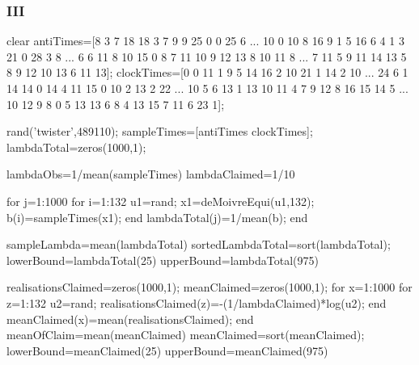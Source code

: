 \subsubsection*{III}
\begin{VrbM}
clear
antiTimes=[8 3 7 18 18 3 7 9 9 25 0 0 25 6 ...
  10 0 10 8 16 9 1 5 16 6 4 1 3 21 0 28 3 8 ...
  6 6 11 8 10 15 0 8 7 11 10 9 12 13 8 10 11 8 ...
    7 11 5 9 11 14 13 5 8 9 12 10 13 6 11 13];
clockTimes=[0 0 11 1 9 5 14 16 2 10 21 1 14 2 10 ...
    24 6 1 14 14 0 14 4 11 15 0 10 2 13 2 22 ...
    10 5 6 13 1 13 10 11 4 7 9 12 8 16 15 14 5 ...
    10 12 9 8 0 5 13 13 6 8 4 13 15 7 11 6 23 1];

rand('twister',489110);%
sampleTimes=[antiTimes clockTimes];%
lambdaTotal=zeros(1000,1);%

lambdaObs=1/mean(sampleTimes)%
lambdaClaimed=1/10 %

for j=1:1000%
    for i=1:132 %
        u1=rand;%
        x1=deMoivreEqui(u1,132);%
        b(i)=sampleTimes(x1);%
    end
    lambdaTotal(j)=1/mean(b);%
end

sampleLambda=mean(lambdaTotal)
sortedLambdaTotal=sort(lambdaTotal);%
lowerBound=lambdaTotal(25)%
upperBound=lambdaTotal(975)

realisationsClaimed=zeros(1000,1);%
meanClaimed=zeros(1000,1);%
for x=1:1000%
    for z=1:132 %
        u2=rand;%
        realisationsClaimed(z)=-(1/lambdaClaimed)*log(u2);
    end
    meanClaimed(x)=mean(realisationsClaimed);
end
meanOfClaim=mean(meanClaimed)%
meanClaimed=sort(meanClaimed);%
lowerBound=meanClaimed(25)
upperBound=meanClaimed(975)
\end{VrbM}

